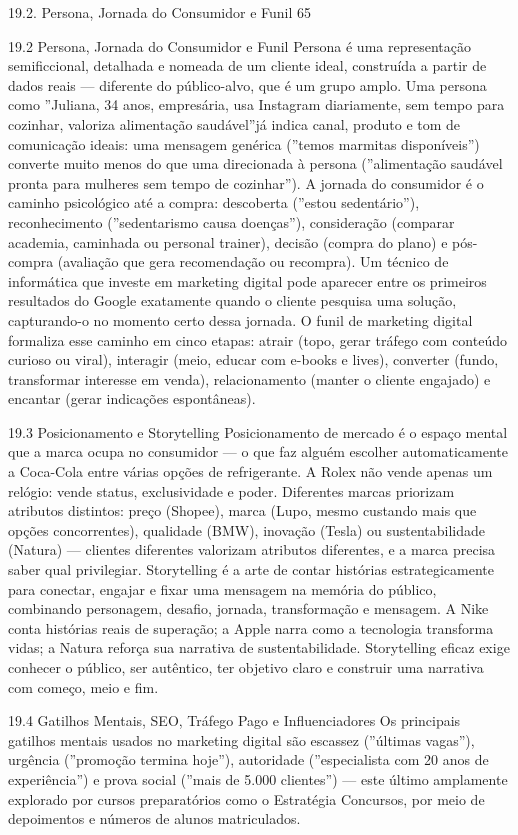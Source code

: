 19.2. Persona, Jornada do Consumidor e Funil 65

19.2 Persona, Jornada do Consumidor e Funil Persona é uma representação semificcional, detalhada e nomeada de um cliente ideal, construída a partir de dados reais — diferente do público-alvo, que é um grupo amplo. Uma persona como ”Juliana, 34 anos, empresária, usa Instagram diariamente, sem tempo para cozinhar, valoriza alimentação saudável”já indica canal, produto e tom de comunicação ideais: uma mensagem genérica (”temos marmitas disponíveis”) converte muito menos do que uma direcionada à persona (”alimentação saudável pronta para mulheres sem tempo de cozinhar”). A jornada do consumidor é o caminho psicológico até a compra: descoberta (”estou sedentário”), reconhecimento (”sedentarismo causa doenças”), consideração (comparar academia, caminhada ou personal trainer), decisão (compra do plano) e pós-compra (avaliação que gera recomendação ou recompra). Um técnico de informática que investe em marketing digital pode aparecer entre os primeiros resultados do Google exatamente quando o cliente pesquisa uma solução, capturando-o no momento certo dessa jornada. O funil de marketing digital formaliza esse caminho em cinco etapas: atrair (topo, gerar tráfego com conteúdo curioso ou viral), interagir (meio, educar com e-books e lives), converter (fundo, transformar interesse em venda), relacionamento (manter o cliente engajado) e encantar (gerar indicações espontâneas).

19.3 Posicionamento e Storytelling Posicionamento de mercado é o espaço mental que a marca ocupa no consumidor — o que faz alguém escolher automaticamente a Coca-Cola entre várias opções de refrigerante. A Rolex não vende apenas um relógio: vende status, exclusividade e poder. Diferentes marcas priorizam atributos distintos: preço (Shopee), marca (Lupo, mesmo custando mais que opções concorrentes), qualidade (BMW), inovação (Tesla) ou sustentabilidade (Natura) — clientes diferentes valorizam atributos diferentes, e a marca precisa saber qual privilegiar. Storytelling é a arte de contar histórias estrategicamente para conectar, engajar e fixar uma mensagem na memória do público, combinando personagem, desafio, jornada, transformação e mensagem. A Nike conta histórias reais de superação; a Apple narra como a tecnologia transforma vidas; a Natura reforça sua narrativa de sustentabilidade. Storytelling eficaz exige conhecer o público, ser autêntico, ter objetivo claro e construir uma narrativa com começo, meio e fim.

19.4 Gatilhos Mentais, SEO, Tráfego Pago e Influenciadores Os principais gatilhos mentais usados no marketing digital são escassez (”últimas vagas”), urgência (”promoção termina hoje”), autoridade (”especialista com 20 anos de experiência”) e prova social (”mais de 5.000 clientes”) — este último amplamente explorado por cursos preparatórios como o Estratégia Concursos, por meio de depoimentos e números de alunos matriculados.

